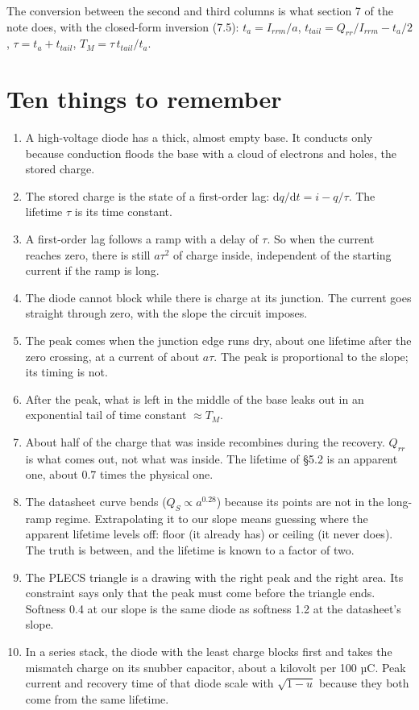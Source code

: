 \documentclass[11pt,a4paper,numbers=noenddot]{scrartcl}
\providecommand{\tightlist}{\setlength{\itemsep}{0pt}\setlength{\parskip}{0pt}}
\begin{document}
\begin{onehalfspace}
The conversion between the second and third columns is what section 7 of the note does, with the closed-form inversion (7.5): \(t_a = I_{rrm}/a\), \(t_{tail} = Q_{rr}/I_{rrm} - t_a/2\), \(\tau = t_a + t_{tail}\), \(T_M = \tau\,t_{tail}/t_a\).

\section{Ten things to remember}\label{ten-things-to-remember}

\begin{enumerate}
\def\labelenumi{\arabic{enumi}.}
\tightlist
\item
  A high-voltage diode has a thick, almost empty base. It conducts only because conduction floods the base with a cloud of electrons and holes, the stored charge.
\item
  The stored charge is the state of a first-order lag: \(\mathrm{d}q/\mathrm{d}t = i - q/\tau\). The lifetime \(\tau\) is its time constant.
\item
  A first-order lag follows a ramp with a delay of \(\tau\). So when the current reaches zero, there is still \(a\tau^2\) of charge inside, independent of the starting current if the ramp is long.
\item
  The diode cannot block while there is charge at its junction. The current goes straight through zero, with the slope the circuit imposes.
\item
  The peak comes when the junction edge runs dry, about one lifetime after the zero crossing, at a current of about \(a\tau\). The peak is proportional to the slope; its timing is not.
\item
  After the peak, what is left in the middle of the base leaks out in an exponential tail of time constant \(\approx T_M\).
\item
  About half of the charge that was inside recombines during the recovery. \(Q_{rr}\) is what comes out, not what was inside. The lifetime of \S5.2 is an apparent one, about 0.7 times the physical one.
\item
  The datasheet curve bends (\(Q_S \propto a^{0.28}\)) because its points are not in the long-ramp regime. Extrapolating it to our slope means guessing where the apparent lifetime levels off: floor (it already has) or ceiling (it never does). The truth is between, and the lifetime is known to a factor of two.
\item
  The PLECS triangle is a drawing with the right peak and the right area. Its constraint says only that the peak must come before the triangle ends. Softness 0.4 at our slope is the same diode as softness 1.2 at the datasheet's slope.
\item
  In a series stack, the diode with the least charge blocks first and takes the mismatch charge on its snubber capacitor, about a kilovolt per 100 µC. Peak current and recovery time of that diode scale with \(\sqrt{1-u}\) because they both come from the same lifetime.
\end{enumerate}


\end{onehalfspace}
\end{document}
